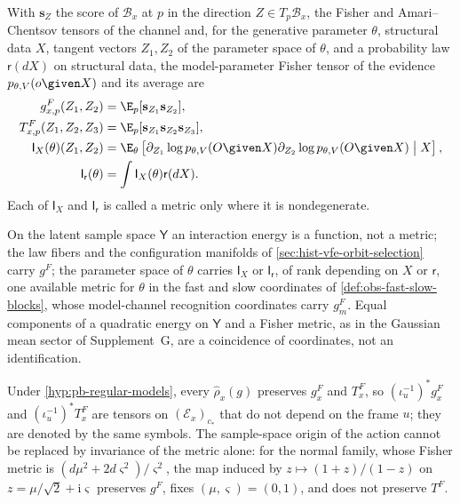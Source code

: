With $\mathbf s_Z$ the score of $\mathcal B_x$ at $p$ in the direction
$Z\in T_p\mathcal B_x$, the Fisher and Amari--Chentsov tensors of the channel and, for
the generative parameter $\theta$, structural data $X$, tangent vectors $Z_1,Z_2$ of the
parameter space of $\theta$, and a probability law $\mathsf r(dX)$ on structural data,
the model-parameter Fisher tensor of the evidence $p_{\theta,V}(o\given X)$ and its
average are
\begin{align}
g^F_{x,p}(Z_1,Z_2)&=\E_p[\mathbf s_{Z_1}\mathbf s_{Z_2}],
\label{eq:pb-fiber-fisher}\\
T^F_{x,p}(Z_1,Z_2,Z_3)&=\E_p[\mathbf s_{Z_1}\mathbf s_{Z_2}\mathbf s_{Z_3}],
\label{eq:pb-fiber-amari}\\
\mathsf I_X(\theta)(Z_1,Z_2)&=\E_\theta\left[\partial_{Z_1}\log p_{\theta,V}(O\given X)
\partial_{Z_2}\log p_{\theta,V}(O\given X)\mathrel{\big|}X\right],
\label{eq:ig-conditional-model-fisher}\\
\mathsf I_{\mathsf r}(\theta)&=\int\mathsf I_X(\theta)\mathsf r(dX).
\label{eq:ig-averaged-model-fisher}
\end{align}
Each of $\mathsf I_X$ and $\mathsf I_{\mathsf r}$ is called a metric only where it is
nondegenerate.

On the latent sample space $\mathsf Y$ an interaction energy is a function, not a metric;
the law fibers and the configuration manifolds of \cref{sec:hist-vfe-orbit-selection}
carry $g^F$; the parameter space of $\theta$ carries $\mathsf I_X$ or
$\mathsf I_{\mathsf r}$, of rank depending on $X$ or $\mathsf r$, one available metric for
$\theta$ in the fast and slow coordinates of \cref{def:obs-fast-slow-blocks}, whose
model-channel recognition coordinates carry $g^F_m$.  Equal components of a quadratic
energy on $\mathsf Y$ and a Fisher metric, as in the Gaussian mean sector of
Supplement~G, are a coincidence of coordinates, not an identification.

Under \cref{hyp:pb-regular-models}, every $\widehat\rho_x(g)$ preserves $g^F_x$ and
$T^F_x$, so $(\iota_u^{-1})^*g^F_x$ and $(\iota_u^{-1})^*T^F_x$ are tensors on
$(\mathcal E_x)_{c_*}$ that do not depend on the frame $u$; they are denoted by the same
symbols.  The sample-space origin of the action cannot be replaced by invariance of the
metric alone: for the normal family, whose Fisher metric is
$(d\mu^2+2d\varsigma^2)/\varsigma^2$, the map induced by $z\mapsto(1+z)/(1-z)$ on
$z=\mu/\sqrt2+\mathrm i\varsigma$ preserves $g^F$, fixes $(\mu,\varsigma)=(0,1)$, and
does not preserve $T^F$.  

